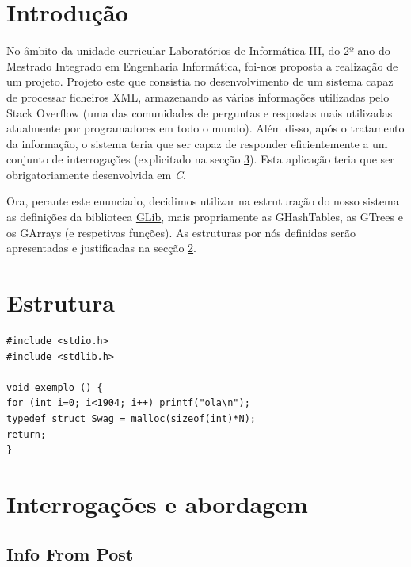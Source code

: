 \documentclass[a4paper, 11pt, oneside]{article}
\begin{document}

\tableofcontents
\lstlistoflistings

\newpage


\section{Introdução}

No âmbito da unidade curricular \underline{Laboratórios de Informática III}, do 2º ano do Mestrado Integrado em Engenharia Informática, foi-nos proposta a realização de um projeto. Projeto este que consistia no desenvolvimento de um sistema capaz de processar ficheiros XML, armazenando as várias informações utilizadas pelo Stack Overflow (uma das comunidades de perguntas e respostas mais utilizadas atualmente por programadores em todo o mundo). Além disso, após o tratamento da informação, o sistema teria que ser capaz de responder eficientemente a um conjunto de interrogações (explicitado na secção \ref{queries}). Esta aplicação teria que ser obrigatoriamente desenvolvida em \textit{C}.

Ora, perante este enunciado, decidimos utilizar na estruturação do nosso sistema as definições da biblioteca \href{https://developer.gnome.org/glib}{GLib}, mais propriamente as GHashTables, as GTrees e os GArrays (e respetivas funções). As estruturas por nós definidas serão apresentadas e justificadas na secção \ref{structs}.


\newpage
\section{Estrutura}
\label{structs}

\begin{lstlisting}[caption= exemplo código]
#include <stdio.h>
#include <stdlib.h>

void exemplo () {
for (int i=0; i<1904; i++) printf("ola\n");
typedef struct Swag = malloc(sizeof(int)*N);
return;
}
\end{lstlisting}

\newpage
\section{Interrogações e abordagem}
\label{queries}


\subsection{Info From Post}
\end{document}

